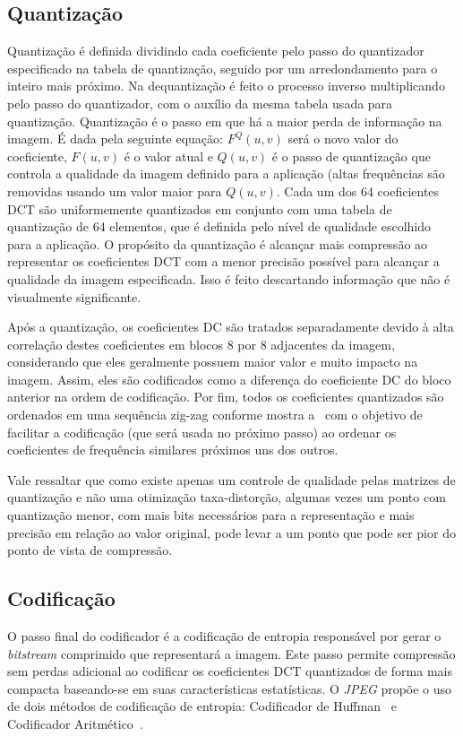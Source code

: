 \subsection{Quantização}
Quantização é definida dividindo cada coeficiente pelo passo do quantizador especificado na tabela de quantização, seguido por um arredondamento para o inteiro mais próximo. Na dequantização é feito o processo inverso multiplicando pelo passo do quantizador, com o auxílio da mesma tabela usada para quantização. Quantização é o passo em que há a maior perda de informação na imagem. É dada pela seguinte equação:
$F^Q(u,v)$ será o novo valor do coeficiente, $F(u,v)$  é o valor atual e $Q(u,v)$ é o passo de quantização que controla a qualidade da imagem definido para a aplicação (altas frequências são removidas usando um valor maior para $Q(u,v)$. Cada um dos 64 coeficientes \acrshort{DCT} são uniformemente quantizados em conjunto com uma tabela de quantização de 64 elementos, que é definida pelo nível de qualidade escolhido para a aplicação. O propósito da quantização é alcançar mais compressão ao representar os coeficientes \acrshort{DCT} com a menor precisão possível para alcançar a qualidade da imagem especificada. Isso é feito descartando informação que não é visualmente significante.

Após a quantização, os coeficientes \acrshort{DC} são tratados separadamente devido à alta correlação destes coeficientes em blocos 8 por 8 adjacentes da imagem, considerando que eles geralmente possuem maior valor e muito impacto na imagem. Assim, eles são codificados como a diferença do coeficiente DC do bloco anterior na ordem de codificação. Por fim, todos os coeficientes quantizados são ordenados em uma sequência zig-zag conforme mostra a~ com o objetivo de facilitar a codificação (que será usada no próximo passo) ao ordenar os coeficientes de frequência similares próximos uns dos outros.

Vale ressaltar que como existe apenas um controle de qualidade pelas matrizes de quantização e não uma otimização taxa-distorção, algumas vezes um ponto com quantização menor, com mais bits necessários para a representação e mais precisão em relação ao valor original, pode levar a um ponto que pode ser pior do ponto de vista de compressão.
\subsection{Codificação}
O passo final do codificador é a codificação de entropia responsável por gerar o \textit{bitstream} comprimido que representará a imagem. Este passo permite compressão sem perdas adicional ao codificar os coeficientes \acrshort{DCT} quantizados de forma mais compacta baseando-se em suas características estatísticas. O \textit{JPEG} propõe o uso de dois métodos de codificação de entropia: Codificador de Huffman~\cite{huffman1952method} e Codificador Aritmético~\cite{pennebaker1988arithmetic}. 

